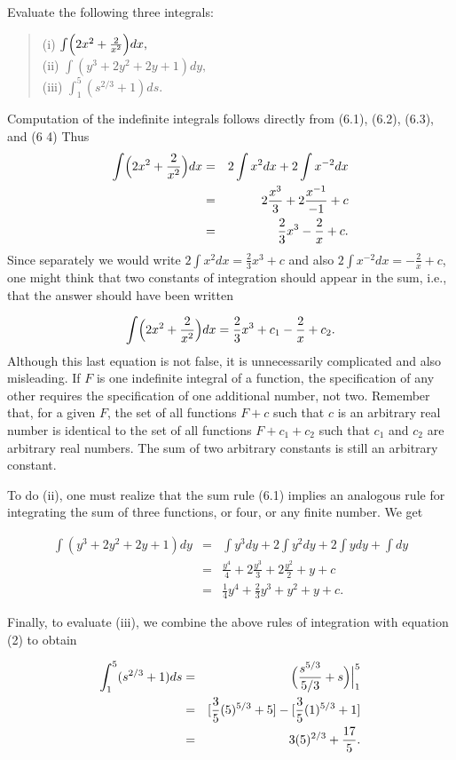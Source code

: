 \begin{example} Evaluate the following three integrals:
 
\begin{quote}
\begin{description}
\item[(i) $\int \Bigl( 2x^2 + \frac{2}{x^2} \Bigr)dx,$]
\item[(ii) $\int (y^3 + 2y^2 + 2y + 1 )dy,$]
\item[(iii) $\int_{1}^{5} (s^{2/3} + 1)ds.$]
\end{description}
\end{quote}
\noindent Computation of the indefinite integrals follows directly from (6.1),
(6.2), (6.3), and (6 4) Thus 
\begin{eqnarray*}
\int  \Bigl( 2x^2 + \frac{2}{x^2} \Bigr) dx &=& 2 \int x^2 dx + 2 \int x^{-2} dx \\
                                            &=& 2 \frac{x^3}{3} + 2 \frac{x^{-1}}{-1} + c \\
                                            &=& \frac{2}{3} x^3 - \frac{2}{x} + c.
\end{eqnarray*}
\noindent Since separately we would write $2 \int x^2 dx = \frac{2}{3} x^3 + c$ and also $2 \int x^{-2} dx = -\frac{2}{x} + c$, one might think that two constants of integration should appear in the sum, i.e., that the answer should have been written

$$
\int \Bigl( 2x^2 + \frac{2}{x^2} \Bigr) dx = \frac{2}{3} x^3 + c_1 - \frac{2}{x} + c_2.
$$
\noindent Although this last equation is not false, it is unnecessarily complicated and also misleading. If $F$ is one indefinite integral of a function, the specification of any other requires the specification of one additional number, not two. Remember that, for a given $F$, the set of all functions $F + c$ such that $c$ is an arbitrary real number is identical to the set of all functions $F + c_1 + c_2$ such that $c_1$ and $c_2$ are arbitrary real numbers. The sum of two arbitrary constants is still an arbitrary constant.

To do (ii), one must realize that the sum rule (6.1) implies an analogous rule for integrating the sum of three functions, or four, or any finite number. We get 

\begin{eqnarray*} 
\int (y^3 + 2y^2 + 2y + 1) dy &=&
\int y^3 dy + 2 \int y^2 dy + 2 \int y dy + \int dy \\
&=& \frac{y^4}{4} +2\frac{y^3}{3} +2\frac{y^2}{2} +y + c \\
&=& \frac{1}{4}y^4 + \frac{2}{3}y^3 + y^2 + y + c.
\end{eqnarray*}

Finally, to evaluate (iii), we combine the above rules of integration with equation (2) to obtain

\begin{eqnarray*}
\int_{1}^{5} (s^{2 /3} + 1) ds &=& \Bigl( \frac{s^{5/3}}{5/3} + s \Bigr) \Big|_{1}^{5}\\
&=& [\frac{3}{5}(5)^{5/3} + 5] - [\frac{3}{5} (1)^{5/3} + 1] \\
&=& 3(5)^{2/3} + \frac{17}{5}.
\end{eqnarray*}
\end{example}

